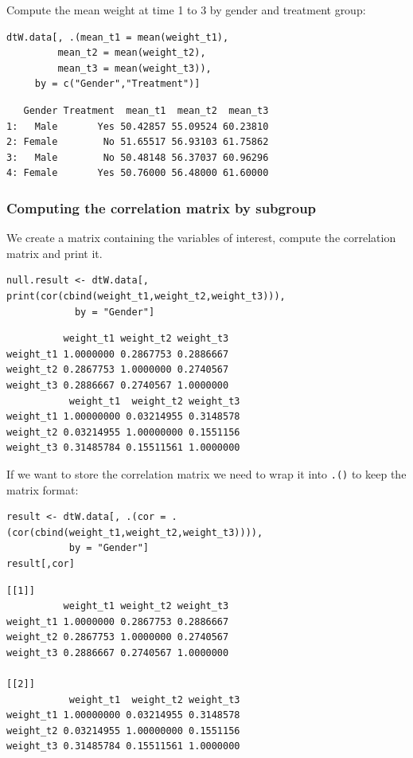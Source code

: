 \documentclass{article}
\begin{document}
Compute the mean weight at time 1 to 3 by gender and treatment group:
\lstset{language=r,label= ,caption= ,captionpos=b,numbers=none}
\begin{lstlisting}
dtW.data[, .(mean_t1 = mean(weight_t1),
	     mean_t2 = mean(weight_t2),
	     mean_t3 = mean(weight_t3)), 
	 by = c("Gender","Treatment")]
\end{lstlisting}

\begin{verbatim}
   Gender Treatment  mean_t1  mean_t2  mean_t3
1:   Male       Yes 50.42857 55.09524 60.23810
2: Female        No 51.65517 56.93103 61.75862
3:   Male        No 50.48148 56.37037 60.96296
4: Female       Yes 50.76000 56.48000 61.60000
\end{verbatim}

\subsubsection{Computing the correlation matrix by subgroup}
\label{sec:org34ddca5}

We create a matrix containing the variables of interest, compute the
correlation matrix and print it.
\lstset{language=r,label= ,caption= ,captionpos=b,numbers=none}
\begin{lstlisting}
null.result <- dtW.data[, print(cor(cbind(weight_t1,weight_t2,weight_t3))), 
			by = "Gender"]
\end{lstlisting}

\begin{verbatim}
          weight_t1 weight_t2 weight_t3
weight_t1 1.0000000 0.2867753 0.2886667
weight_t2 0.2867753 1.0000000 0.2740567
weight_t3 0.2886667 0.2740567 1.0000000
           weight_t1  weight_t2 weight_t3
weight_t1 1.00000000 0.03214955 0.3148578
weight_t2 0.03214955 1.00000000 0.1551156
weight_t3 0.31485784 0.15511561 1.0000000
\end{verbatim}

If we want to store the correlation matrix we need to wrap it into
\texttt{.()} to keep the matrix format:
\lstset{language=r,label= ,caption= ,captionpos=b,numbers=none}
\begin{lstlisting}
result <- dtW.data[, .(cor = .(cor(cbind(weight_t1,weight_t2,weight_t3)))), 
		   by = "Gender"]
result[,cor]
\end{lstlisting}

\begin{verbatim}
[[1]]
          weight_t1 weight_t2 weight_t3
weight_t1 1.0000000 0.2867753 0.2886667
weight_t2 0.2867753 1.0000000 0.2740567
weight_t3 0.2886667 0.2740567 1.0000000

[[2]]
           weight_t1  weight_t2 weight_t3
weight_t1 1.00000000 0.03214955 0.3148578
weight_t2 0.03214955 1.00000000 0.1551156
weight_t3 0.31485784 0.15511561 1.0000000
\end{verbatim}
\end{document}
